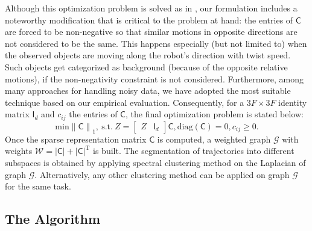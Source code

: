 \documentclass[10pt,twocolumn,letterpaper]{article}  %
\begin{document}
Although this optimization problem is solved as in \cite{c2}, our formulation includes a noteworthy modification that is critical to the problem at hand: the entries of $\mathsf{C}$ are forced to be non-negative so that similar motions in opposite directions are not considered to be the same. This happens especially (but not limited to) when the observed objects are moving along the robot's direction with twist speed. Such objects get categorized as background (because of the opposite relative motions), if the non-negativity constraint is not considered. 
Furthermore, among many approaches for handling noisy data, we have adopted the most suitable technique based on our empirical evaluation. Consequently, for a $3F\times 3F$ identity matrix $\mathsf{I}_d$ and $c_{ij}$ the entries of $\mathsf{C}$, the final optimization problem is stated below:
\begin{equation}
\label{eq:SR_4}
\text{min} {\parallel \mathsf{C} \parallel}_1, \ \text{s.t.} \ Z \!=\!
\left[\!
\begin{array}{cc} Z \! & \! \mathsf{I}_d
\end{array}  \!\right]\! \mathsf{C}, \text{diag} ( \mathsf{C} )=0 , c_{ij}\geq 0.
\end{equation}
Once the sparse representation matrix $\mathsf{C}$ is computed, a weighted graph $\mathcal{G}$ with weights $\mathcal{W} =  |\mathsf{C}| + {|\mathsf{C}|}^\text{T}$ is built. The segmentation of trajectories into different subspaces is obtained by applying  spectral clustering \cite{c14} method on the Laplacian of graph $\mathcal{G}$. Alternatively, any other clustering method can be applied on graph $\mathcal{G}$ for the same task.



\subsection{The Algorithm}
\label{ssc}
\end{document}
